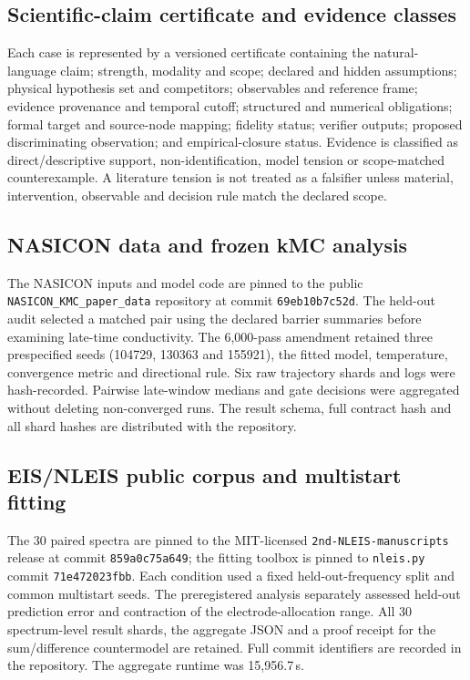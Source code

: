 \documentclass[pdflatex,sn-nature]{sn-jnl}
\newcommand{\kmc}{kMC}
\newcommand{\nleis}{NLEIS}
\begin{document}
\subsection{Scientific-claim certificate and evidence classes}

Each case is represented by a versioned certificate containing the natural-language claim; strength, modality and scope; declared and hidden assumptions; physical hypothesis set and competitors; observables and reference frame; evidence provenance and temporal cutoff; structured and numerical obligations; formal target and source-node mapping; fidelity status; verifier outputs; proposed discriminating observation; and empirical-closure status. Evidence is classified as direct/descriptive support, non-identification, model tension or scope-matched counterexample. A literature tension is not treated as a falsifier unless material, intervention, observable and decision rule match the declared scope.

\subsection{NASICON data and frozen \kmc{} analysis}

The NASICON inputs and model code are pinned to the public \texttt{NASICON\_KMC\_paper\_data} repository at commit \texttt{69eb10b7c52d}. The held-out audit selected a matched pair using the declared barrier summaries before examining late-time conductivity. The 6,000-pass amendment retained three prespecified seeds (104729, 130363 and 155921), the fitted model, temperature, convergence metric and directional rule. Six raw trajectory shards and logs were hash-recorded. Pairwise late-window medians and gate decisions were aggregated without deleting non-converged runs. The result schema, full contract hash and all shard hashes are distributed with the repository.

\subsection{EIS/\nleis{} public corpus and multistart fitting}

The 30 paired spectra are pinned to the MIT-licensed \texttt{2nd-NLEIS-manuscripts} release at commit \texttt{859a0c75a649}; the fitting toolbox is pinned to \texttt{nleis.py} commit \texttt{71e472023fbb}. Each condition used a fixed held-out-frequency split and common multistart seeds. The preregistered analysis separately assessed held-out prediction error and contraction of the electrode-allocation range. All 30 spectrum-level result shards, the aggregate JSON and a proof receipt for the sum/difference countermodel are retained. Full commit identifiers are recorded in the repository. The aggregate runtime was 15,956.7\,s.
\end{document}
